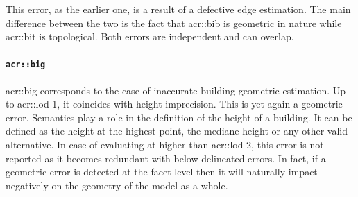                 \begin{figure}[H]
                    \centering
                \end{figure}

                This error, as the earlier one, is a result of a defective edge estimation.
                The main difference between the two is the fact that \gls{acr::bib} is geometric in nature while \gls{acr::bit} is topological.
                Both errors are independent and can overlap.

            \paragraph{\texttt{\acrlong*{acr::big}}}
                \gls{acr::big} corresponds to the case of inaccurate building geometric estimation.
                Up to \gls{acr::lod}-1, it coincides with height imprecision.
                This is yet again a geometric error.
                Semantics play a role in the definition of the height of a building.
                It can be defined as the height at the highest point, the mediane height or any other valid alternative.
                In case of evaluating at higher than \gls{acr::lod}-2, this error is not reported as it becomes redundant with below delineated errors.
                In fact, if a geometric error is detected at the facet level then it will naturally impact negatively on the geometry of the model as a whole.
            
